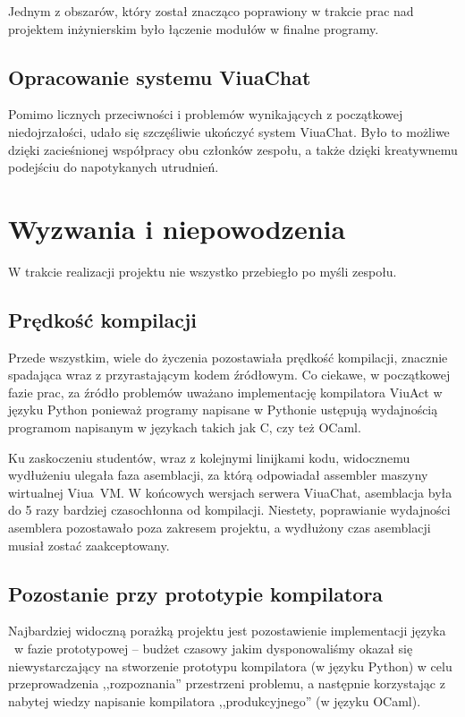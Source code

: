 Jednym z obszarów, który został znacząco poprawiony w trakcie prac nad
projektem inżynierskim było łączenie modułów w finalne programy.

\subsection{Opracowanie systemu ViuaChat}
Pomimo licznych przeciwności i problemów wynikających z początkowej niedojrzałości, udało się szczęśliwie ukończyć system ViuaChat. Było to
możliwe dzięki zacieśnionej współpracy obu członków zespołu, a także dzięki
kreatywnemu podejściu do napotykanych utrudnień.

\section{Wyzwania i niepowodzenia}

W trakcie realizacji projektu nie wszystko przebiegło po myśli zespołu.

\subsection{Prędkość kompilacji}

Przede wszystkim, wiele do życzenia pozostawiała prędkość kompilacji, znacznie
spadająca wraz z przyrastającym kodem źródłowym. Co ciekawe, w początkowej fazie
prac, za źródło problemów uważano implementację kompilatora ViuAct w języku
Python ponieważ programy napisane w Pythonie ustępują wydajnością programom
napisanym w językach takich jak C, czy też OCaml.

Ku zaskoczeniu studentów, wraz z kolejnymi linijkami kodu, widocznemu wydłużeniu
ulegała faza asemblacji, za którą odpowiadał assembler maszyny wirtualnej
Viua~VM. W końcowych wersjach serwera ViuaChat, asemblacja była do 5 razy
bardziej czasochłonna od kompilacji. Niestety, poprawianie wydajności asemblera
pozostawało poza zakresem projektu, a wydłużony czas asemblacji musiał zostać
zaakceptowany.

\subsection{Pozostanie przy prototypie kompilatora}

Najbardziej widoczną porażką projektu jest pozostawienie implementacji języka
\ViuAct\ w fazie prototypowej -- budżet czasowy jakim dysponowaliśmy okazał się
niewystarczający na stworzenie prototypu kompilatora (w języku Python) w celu
przeprowadzenia ,,rozpoznania'' przestrzeni problemu, a następnie korzystając z
nabytej wiedzy napisanie kompilatora ,,produkcyjnego'' (w języku OCaml).


